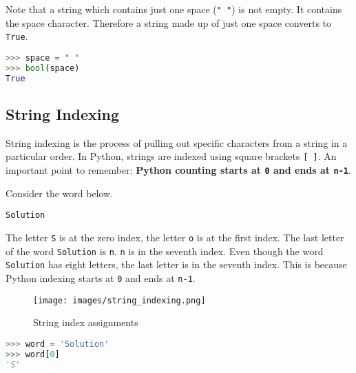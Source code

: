 \documentclass{book}
\makeatletter
\def\maxwidth{\ifdim\Gin@nat@width>\linewidth\linewidth
\else\Gin@nat@width\fi}
\let\Oldincludegraphics\includegraphics
\renewcommand{\includegraphics}[1]{\Oldincludegraphics[width=.8\maxwidth]{#1}}
\newcommand{\passthrough}[1]{#1}
\makeatother
\begin{document}
Note that a string which contains just one space
(\passthrough{\lstinline!" "!}) is not empty. It contains the space
character. Therefore a string made up of just one space converts to
\passthrough{\lstinline!True!}.

\begin{lstlisting}[language=Python]
>>> space = " "
>>> bool(space)
True
\end{lstlisting}
    




    
        \hypertarget{string-indexing}{%
\subsection{String Indexing}\label{string-indexing}}

String indexing is the process of pulling out specific characters from a
string in a particular order. In Python, strings are indexed using
square brackets \passthrough{\lstinline![ ]!}. An important point to
remember: \textbf{Python counting starts at \passthrough{\lstinline!0!}
and ends at \passthrough{\lstinline!n-1!}}.

Consider the word below.

\begin{lstlisting}
Solution
\end{lstlisting}

The letter \passthrough{\lstinline!S!} is at the zero index, the letter
\passthrough{\lstinline!o!} is at the first index. The last letter of
the word \passthrough{\lstinline!Solution!} is
\passthrough{\lstinline!n!}. \passthrough{\lstinline!n!} is in the
seventh index. Even though the word \passthrough{\lstinline!Solution!}
has eight letters, the last letter is in the seventh index. This is
because Python indexing starts at \passthrough{\lstinline!0!} and ends
at \passthrough{\lstinline!n-1!}.

\begin{figure}
\centering
\texttt{[image: images/string\_indexing.png]}
\caption{String index assignments}
\end{figure}
    




    
        \begin{lstlisting}[language=Python]
>>> word = 'Solution'
>>> word[0]
'S'
\end{lstlisting}
    
\end{document}
